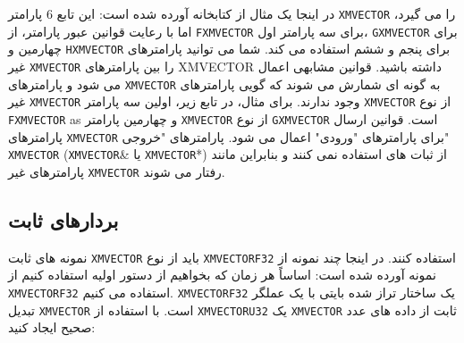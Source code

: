 {\begin{spacing}{1.5}
        در اینجا یک مثال از کتابخانه  آورده شده است:
        \textbf{\vspace{6pt}}
        \lr{}
        \textbf{\vspace{6pt}}
        این تابع 6 پارامتر \texttt{XMVECTOR} را می گیرد، اما با رعایت قوانین عبور پارامتر، از \texttt{FXMVECTOR} برای سه پارامتر اول، \texttt{GXMVECTOR} برای چهارمین و \texttt{HXMVECTOR} برای پنجم و ششم استفاده می کند.
        شما می توانید پارامترهای غیر \texttt{XMVECTOR} را بین پارامترهای XMVECTOR داشته باشید.
        قوانین مشابهی اعمال می شود و پارامترهای \texttt{XMVECTOR} به گونه ای شمارش می شوند که گویی پارامترهای غیر \texttt{XMVECTOR} وجود ندارند.
        برای مثال، در تابع زیر، اولین سه پارامتر \texttt{XMVECTOR} از نوع \texttt{FXMVECTOR} as و چهارمین پارامتر \texttt{XMVECTOR} از نوع \texttt{GXMVECTOR} است.
        \textbf{\vspace{6pt}}
        \lr{}
        \textbf{\vspace{6pt}}
        قوانین ارسال پارامترهای \texttt{XMVECTOR} برای پارامترهای "ورودی" اعمال می شود.
        پارامترهای "خروجی" \texttt{XMVECTOR} (\texttt{XMVECTOR}& یا \texttt{XMVECTOR}*) از ثبات های  استفاده نمی کنند و بنابراین مانند پارامترهای غیر \texttt{XMVECTOR} رفتار می شوند.
    \end{spacing}
}

\subsection{\textbf{بردارهای ثابت}}
{
    \Large
    \begin{spacing}{1.5}
        نمونه های ثابت \texttt{XMVECTOR} باید از نوع \texttt{XMVECTORF32} استفاده کنند. در اینجا چند نمونه از نمونه  آورده شده است:
        \textbf{\vspace{6pt}}
        \lr{}
        \textbf{\vspace{6pt}}
        اساساً هر زمان که بخواهیم از دستور اولیه استفاده کنیم از \texttt{XMVECTORF32} استفاده می کنیم.
        \texttt{XMVECTORF32} یک ساختار تراز شده  بایتی با یک عملگر تبدیل \texttt{XMVECTOR} است.
        \textbf{\vspace{6pt}}
        \lr{}
        \textbf{\vspace{6pt}}
        با استفاده از \texttt{XMVECTORU32} یک \texttt{XMVECTOR} ثابت از داده های عدد صحیح ایجاد کنید:
        \textbf{\vspace{6pt}}
        \lr{}
    \end{spacing}
}

